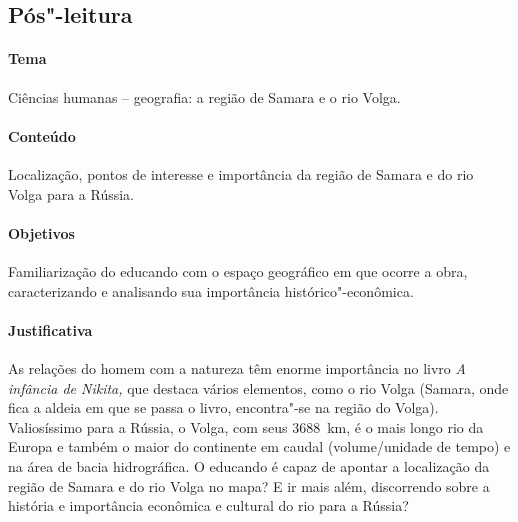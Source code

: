 \documentclass[11pt]{extarticle}
\begin{document}
\subsection{Pós"-leitura}

\paragraph{Tema} Ciências humanas -- geografia: a região de Samara e o rio Volga.


\paragraph{Conteúdo}
Localização, pontos de interesse e importância da região de Samara e do
rio Volga para a Rússia.

\paragraph{Objetivos}
Familiarização do educando com o espaço geográfico em que ocorre a obra,
caracterizando e analisando sua importância histórico"-econômica.

\paragraph{Justificativa}
As relações do homem com a natureza têm enorme importância no livro
\emph{A infância de Nikita,} que destaca vários elementos, como o rio
Volga (Samara, onde fica a aldeia em que se passa o livro, encontra"-se na
região do Volga). Valiosíssimo para a Rússia, o Volga, com seus 3688~km,
é o mais longo rio da Europa e também o maior do
continente em caudal (volume/unidade de tempo) e na área de bacia
hidrográfica. O educando é capaz de apontar a localização da região de
Samara e do rio Volga no mapa? E ir mais além, discorrendo sobre a
história e importância econômica e cultural do rio para a Rússia?

\end{document}
